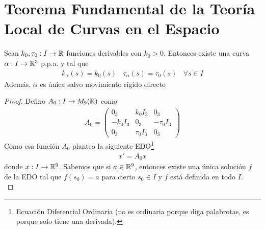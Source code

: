 \section{Teorema Fundamental de la Teoría Local de Curvas en el Espacio}
\begin{teo}
    Sean $k_0, \tau_0:I\to \mathbb{R}$ funciones derivables con $k_0>0$. Entonces existe una curva $\alpha:I\to \mathbb{R}^3$ p.p.a. y tal que 
    \begin{gather*}
        k_\alpha(s) = k_0(s)\ \ \ \ \tau_\alpha(s)=\tau_0(s)\ \ \ \ \forall s \in I
    \end{gather*}
    Además, $\alpha$ es única salvo movimiento rígido directo
    \begin{proof}
        Defino $A_0:I\to M_9(\mathbb{R})$ como 
        \begin{gather*}
            A_0 = \left(\begin{array}{c|c|c}
                0_3 & k_0I_3 & 0_3\\
                \hline
                -k_0I_3 & 0_3 & -\tau_0I_3\\
                \hline
                0_3 & \tau_0I_3 & 0_3
            \end{array}\right)
        \end{gather*}
        Como esa función $A_0$ planteo la siguiente EDO\footnote{Ecuación Diferencial Ordinaria (no es ordinaria porque diga palabrotas, es porque solo tiene una derivada).}
        \begin{gather*}
            x'=A_0x
        \end{gather*}
        donde $x:I\to \mathbb{R}^9$. Sabemos que si $a\in \mathbb{R}^9$, entonces existe una única solución $f$ de la EDO tal que $f(s_0)=a$ para cierto $s_0\in I$ y $f$ está definida en todo $I$. \\


\end{proof}
\end{teo}
